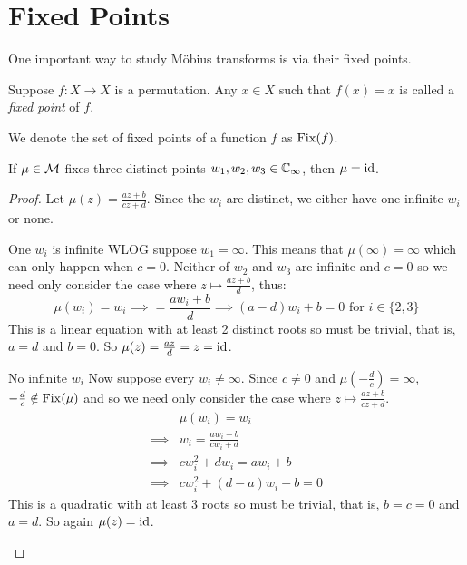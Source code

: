 \documentclass[../main.tex]{subfiles}
\begin{document}
\section{Fixed Points}
One important way to study M\"obius transforms is via their fixed points.
\begin{definition}
  Suppose $f: X \to X$ is a permutation.
  Any $x \in X$ such that $f(x) = x$ is called a \textit{fixed point} of $f$.
\end{definition}
\begin{remark}[Notation]
  We denote the set of fixed points of a function $f$ as $\operatorname{Fix}(f)$.
\end{remark}
\begin{lemma}
  If $\mu \in \mathcal{M}$ fixes three distinct points $w_1, w_2, w_3 \in \mathbb{C}_{\infty}$, then $\mu = \mathrm{id}$.
  \label{threePointMob}
\end{lemma}
\begin{proof}
  Let $\mu(z) = \frac{az + b}{cz + d}$.
  Since the $w_i$ are distinct, we either have one infinite $w_i$ or none.
  \begin{proofcases}
    \begin{case}{One $w_i$ is infinite}
      WLOG suppose $w_1 = \infty$.
      This means that $\mu(\infty) = \infty$ which can only happen when $c = 0$.
      Neither of $w_2$ and $w_3$ are infinite and $c = 0$ so we need only consider the case where $z \mapsto \frac{az + b}{d}$, thus:
      \[
        \mu(w_i) = w_i \implies = \frac{aw_i + b}{d} \implies (a - d)w_i + b = 0 \text{ for $i \in \{2, 3\}$}
      \]
      This is a linear equation with at least 2 distinct roots so must be trivial, that is, $a = d$ and $b = 0$.
      So $\mu(z) = \frac{az}{d} = z = \mathrm{id}$.
    \end{case}
    \begin{case}{No infinite $w_i$}
      Now suppose every $w_i \neq \infty$.
      Since $c \neq 0$ and $\mu(-\frac{d}{c}) = \infty$, $-\frac{d}{c} \notin \operatorname{Fix}(\mu)$ and so we need only consider the case where $z \mapsto \frac{az + b}{cz + d}$.
      \begin{align*}
        &\mu(w_i) = w_i \\
        \implies& w_i = \frac{aw_i + b}{cw_i + d} \\
        \implies& cw^{2}_{i} + dw_i = aw_i + b \\
        \implies& cw^{2}_{i} + (d - a)w_i - b = 0
      \end{align*}
      This is a quadratic with at least 3 roots so must be trivial, that is, $b = c = 0$ and $a = d$.
      So again $\mu(z) = \mathrm{id}$.
    \end{case}
  \end{proofcases}
\end{proof}
\end{document}
